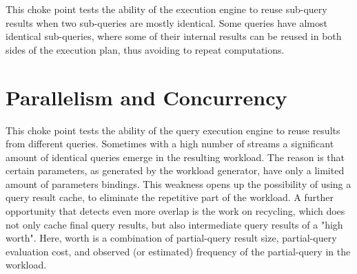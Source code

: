



This choke point tests the ability of the execution engine to reuse sub-query results when two sub-queries are mostly identical.
Some queries have almost identical sub-queries, where some of their internal results can be reused in both sides of the execution plan, thus avoiding to repeat computations.




\section{Parallelism and Concurrency}



This choke point tests the ability of the query execution engine to reuse results from different queries. Sometimes with a high number of streams a significant amount of identical queries emerge in the resulting workload.
The reason is that certain parameters, as generated by the workload generator, have only a limited amount of parameters bindings.
This weakness opens up the possibility of using a query result cache, to eliminate the repetitive part of the workload.
A further opportunity that detects even more overlap is the work on recycling, which does not only cache final query results, but also intermediate query results of a "high worth".
Here, worth is a combination of partial-query result size, partial-query evaluation cost, and observed (or estimated) frequency of the partial-query in the workload.




